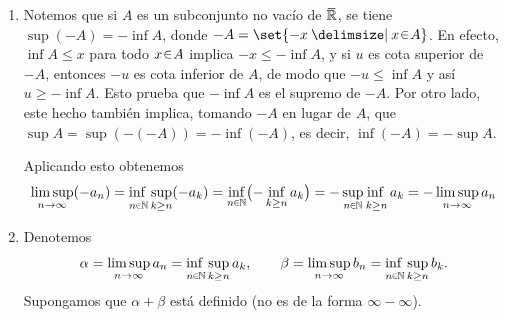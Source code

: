 \begin{sol}
\begin{enumerate}[label=(\roman*)]
Ahora, las sucesiones $\{x_n\}$ y $\{y_n\}$ son, respectivamente, no creciente y no decreciente en $\ubar{\mathbb{R}}$ (pues al aumentar $n$, tomamos supremo sobre un conjunto más pequeño). Sus límites (en el sentido de ínfimo y supremo, respectivamente) siempre existen en $\ubar{\mathbb{R}}$. Definimos entonces:
\[
\limsup_{n\to\infty} a_n := \inf_{n\en\mathbb{N}} x_n = \adjustlimits\inf_{n\en\mathbb{N}} \sup_{k \ge n} a_k,
\]
\[
\liminf_{n\to\infty} a_n := \sup_{n\en\mathbb{N}} y_n = \adjustlimits\sup_{n\en\mathbb{N}} \inf_{k \ge n} a_k.
\]

Estas definiciones tienen sentido porque los conjuntos $\set{x_n \given n \en \mathbb{N}}$ y $\set{y_n \given n \en \mathbb{N}}$ son no vacíos, y por lo probado anteriormente, su ínfimo y supremo existen en $\ubar{\mathbb{R}}$. Por tanto, $\limsup a_n$ y $\liminf a_n$ siempre existen en $\ubar{\mathbb{R}}$.
\item %
Notemos que si $A$ es un subconjunto no vacío de $\ubar{\mathbb{R}}$, 
se tiene $\sup(-A) = -\inf A$, donde $-A = \set{-x \given x \en A}$. En efecto, $\inf A \leq x$ para todo $x \en A$ implica $-x \leq -\inf A$, y si $u$ es cota superior de $-A$,
entonces $-u$ es cota inferior de $A$, de modo que $-u \leq \inf A$ y así $u \ge -\inf A$.
Esto prueba que $-\inf A$ es el supremo de $-A$. Por otro lado, este hecho también implica, tomando $-A$ en lugar de $A$, que $\sup A =\sup(-(-A)) = -\inf(-A)$, es decir, $\inf(-A) = -\sup A$.

Aplicando esto obtenemos
\[
\limsup_{n\to\infty} (-a_n) 
= \adjustlimits\inf_{n\en\mathbb{N}} \sup_{k \ge n} (-a_k)
= \inf_{n\en\mathbb{N}} \bigl( -\inf_{k \ge n} a_k \bigr)
= {-\adjustlimits\sup_{n\en\mathbb{N}}\inf_{k \ge n} a_k}
= {-\limsup_{n\to\infty}a_n}
\]
\item %
Denotemos 
\[
\alpha = \limsup_{n\to\infty} a_n = \adjustlimits\inf_{n\en\mathbb{N}} \sup_{k \ge n} a_k, \qquad 
\beta = \limsup_{n\to\infty} b_n = \adjustlimits\inf_{n\en\mathbb{N}} \sup_{k \ge n} b_k.
\]
Supongamos que $\alpha + \beta$ está definido (no es de la forma $\infty - \infty$).


\end{enumerate}
\end{sol}
